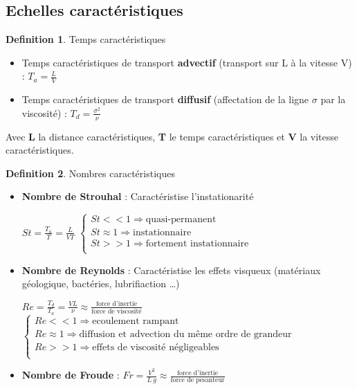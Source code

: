 \documentclass[french]{article}
\theoremstyle{definition}
\newtheorem{definition}{Definition}[section]
\begin{document}
\subsection{Echelles caractéristiques}

\begin{definition} Temps caractéristiques\par
	\begin{itemize} 
		\item Temps caractéristiques de transport \textbf{advectif} (transport sur L à la vitesse V) : $T_a = \frac{L}{V}$
		\item Temps caractéristiques de transport \textbf{diffusif} (affectation de la ligne $\sigma$ par la viscosité) : $T_d = \frac{\sigma^2}{\nu}$
	\end{itemize}
	Avec \textbf{L} la distance caractéristiques, \textbf{T} le temps caractéristiques et \textbf{V} la vitesse caractéristiques.
\end{definition}

\begin{definition} Nombres caractéristiques\par
	\begin{itemize} 
		\item \textbf{Nombre de Strouhal} : Caractéristise l'instationarité
		
		$St = \frac{T_a}{T} = \frac{L}{VT}$
		$
		\left\{
			\begin{array}{ll}
				St << 1 \Rightarrow \mbox{quasi-permanent} \\
				St \approx 1 \Rightarrow \mbox{instationnaire} \\
				St >> 1 \Rightarrow \mbox{fortement instationnaire} \\
			\end{array}
		\right.
		$

		\item \textbf{Nombre de Reynolds} : Caractéristise les effets visqueux (matériaux géologique, bactéries, lubrifiaction \dots)
		
		$Re = \frac{T_d}{T_a} = \frac{VL}{\nu}  \approx \frac{\mbox{force d'inertie}}{\mbox{force de viscosité}}$
		$
		\left\{
			\begin{array}{ll}
				Re << 1 \Rightarrow \mbox{ecoulement rampant} \\
				Re \approx 1 \Rightarrow \mbox{diffusion et advection du même ordre de grandeur} \\
				Re >> 1 \Rightarrow \mbox{effets de viscosité négligeables} \\
			\end{array}
		\right.
		$
		\item \textbf{Nombre de Froude} : $Fr = \frac{V^2}{L \ g}  \approx \frac{\mbox{force d'inertie}}{\mbox{force de pesanteur}}$ 
	\end{itemize} 
\end{definition}
\end{document}
